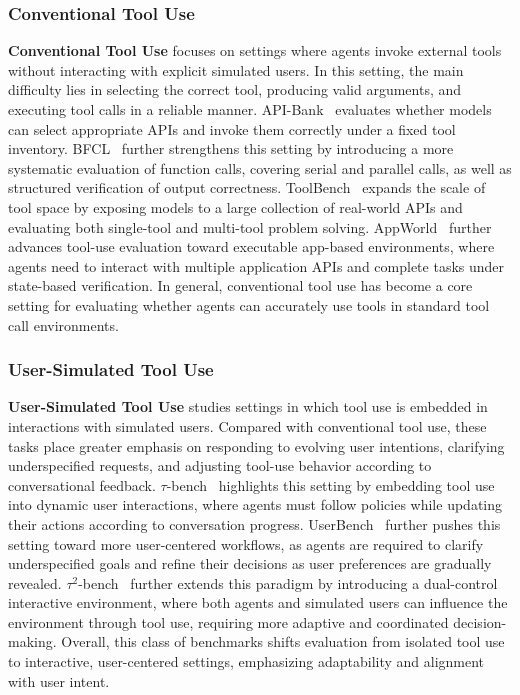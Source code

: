 \documentclass{llmxive}
\begin{document}
\subsubsection{Conventional Tool Use}
\label{Conventional Tool Use}
\textbf{Conventional Tool Use} focuses on settings where agents invoke external tools without interacting with explicit simulated users. In this setting, the main difficulty lies in selecting the correct tool, producing valid arguments, and executing tool calls in a reliable manner. API-Bank~\cite{API-Bank} evaluates whether models can select appropriate APIs and invoke them correctly under a fixed tool inventory. BFCL~\cite{BFCL} further strengthens this setting by introducing a more systematic evaluation of function calls, covering serial and parallel calls, as well as structured verification of output correctness.  %
ToolBench~\cite{ToolBench} expands the scale of tool space by exposing models to a large collection of real-world APIs and evaluating both single-tool and multi-tool problem solving. AppWorld~\cite{AppWorld2024} further advances tool-use evaluation toward executable app-based environments, where agents need to interact with multiple application APIs and complete tasks under state-based verification. In general, conventional tool use has become a core setting for evaluating whether agents can accurately use tools in standard tool call environments.

\subsubsection{User-Simulated Tool Use}
\label{User-Simulated Tool Use}
\textbf{User-Simulated Tool Use} studies settings in which tool use is embedded in interactions with simulated users. Compared with conventional tool use, these tasks place greater emphasis on responding to evolving user intentions, clarifying underspecified requests, and adjusting tool-use behavior according to conversational feedback. $\tau$-bench~\cite{tau-bench} highlights this setting by embedding tool use into dynamic user interactions, where agents must follow policies while updating their actions according to conversation progress. UserBench~\cite{UserBench} further pushes this setting toward more user-centered workflows, as agents are required to clarify underspecified goals and refine their decisions as user preferences are gradually revealed. $\tau^2$-bench~\cite{tau2-bench} further extends this paradigm by introducing a dual-control interactive environment, where both agents and simulated users can influence the environment through tool use, requiring more adaptive and coordinated decision-making. Overall, this class of benchmarks shifts evaluation from isolated tool use to interactive, user-centered settings, emphasizing adaptability and alignment with user intent.
\end{document}
